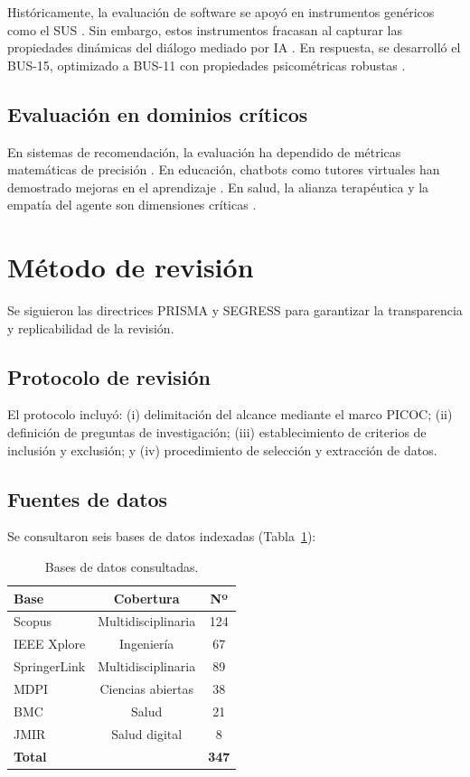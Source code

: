 \documentclass[11pt,twocolumn]{article}
\begin{document}
Históricamente, la evaluación de software se apoyó en instrumentos genéricos como el SUS \cite{sus1996}. Sin embargo, estos instrumentos fracasan al capturar las propiedades dinámicas del diálogo mediado por IA \cite{borsci2021}. En respuesta, se desarrolló el BUS-15, optimizado a BUS-11 con propiedades psicométricas robustas \cite{borsci2022}.

\subsection{Evaluación en dominios críticos}

En sistemas de recomendación, la evaluación ha dependido de métricas matemáticas de precisión \cite{jannach2022}. En educación, chatbots como tutores virtuales han demostrado mejoras en el aprendizaje \cite{kuhail2022, belda2023}. En salud, la alianza terapéutica y la empatía del agente son dimensiones críticas \cite{he2022, fan2023, chung2021}.

\section{Método de revisión}

Se siguieron las directrices PRISMA \cite{prisma2020} y SEGRESS \cite{segress2023} para garantizar la transparencia y replicabilidad de la revisión.

\subsection{Protocolo de revisión}

El protocolo incluyó: (i) delimitación del alcance mediante el marco PICOC; (ii) definición de preguntas de investigación; (iii) establecimiento de criterios de inclusión y exclusión; y (iv) procedimiento de selección y extracción de datos.

\subsection{Fuentes de datos}

Se consultaron seis bases de datos indexadas (Tabla~\ref{tab:fuentes}):

\begin{table}[H]
\centering
\caption{Bases de datos consultadas.}
\label{tab:fuentes}
\begin{tabular}{@{}lcc@{}}
\toprule
\textbf{Base} & \textbf{Cobertura} & \textbf{Nº} \\
\midrule
Scopus & Multidisciplinaria & 124 \\
IEEE Xplore & Ingeniería & 67 \\
SpringerLink & Multidisciplinaria & 89 \\
MDPI & Ciencias abiertas & 38 \\
BMC & Salud & 21 \\
JMIR & Salud digital & 8 \\
\midrule
\textbf{Total} & & \textbf{347} \\
\bottomrule
\end{tabular}
\end{table}
\end{document}
